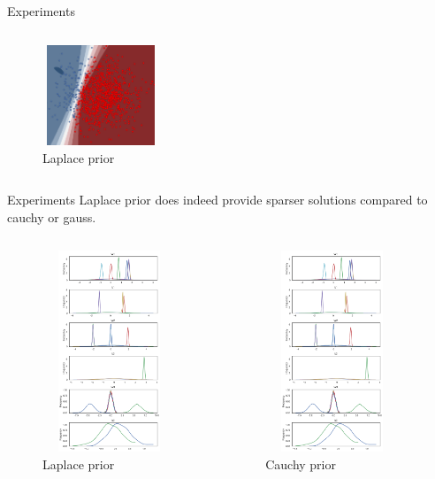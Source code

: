 \documentclass{beamer}
\begin{document}
\begin{frame}{Experiments}
\begin{columns}[t]
		\vspace{-9mm}
		\begin{figure}
			\includegraphics[width=3.5cm,height=3cm]{pres_pics/p_laplace.png}
			\caption{Laplace prior}
		\end{figure}
	\end{columns}
\end{frame}

\begin{frame}{Experiments}
	Laplace prior does indeed provide sparser solutions compared to cauchy or gauss.
	\vspace{-8mm}
	\begin{columns}[t]
		\centering
		\begin{figure}
			\includegraphics[width=4cm,height=6cm]{pres_pics/trace_laplace.png}
			\vspace{-3mm}
			\caption{Laplace prior}
		\end{figure}
		\centering
		\begin{figure}
			\includegraphics[width=4cm,height=6cm]{pres_pics/trace_laplace.png}
			\vspace{-3mm}
			\caption{Cauchy prior}
		\end{figure}
	\end{columns}
\end{frame}
\end{document}
